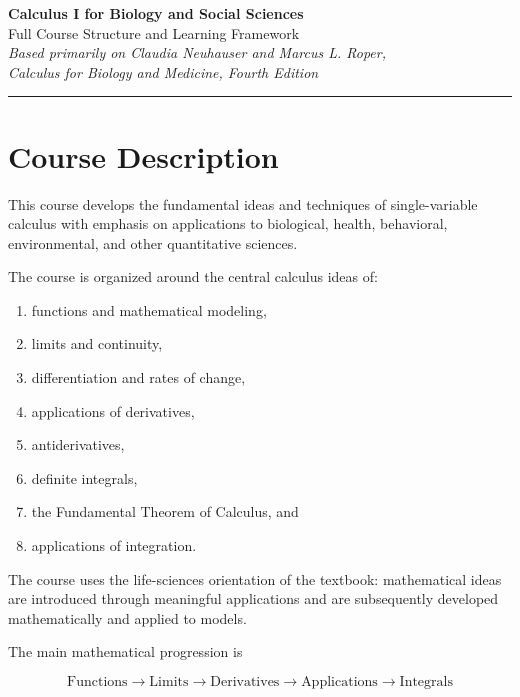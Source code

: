 \documentclass[11pt]{article}
\begin{document}
\begin{center}
    {\LARGE\bfseries Calculus I for Biology and Social Sciences}\\[4pt]
    {\large Full Course Structure and Learning Framework}\\[8pt]
    \textit{Based primarily on Claudia Neuhauser and Marcus L. Roper,}\\
    \textit{Calculus for Biology and Medicine, Fourth Edition}\\[8pt]
\end{center}

\hrule
\vspace{0.5cm}

\section{Course Description}

This course develops the fundamental ideas and techniques of single-variable
calculus with emphasis on applications to biological, health, behavioral,
environmental, and other quantitative sciences.

The course is organized around the central calculus ideas of:

\begin{enumerate}[label=\arabic*.]
    \item functions and mathematical modeling,
    \item limits and continuity,
    \item differentiation and rates of change,
    \item applications of derivatives,
    \item antiderivatives,
    \item definite integrals,
    \item the Fundamental Theorem of Calculus, and
    \item applications of integration.
\end{enumerate}

The course uses the life-sciences orientation of the textbook: mathematical
ideas are introduced through meaningful applications and are subsequently
developed mathematically and applied to models.

The main mathematical progression is

\[
\boxed{
\text{Functions}
\longrightarrow
\text{Limits}
\longrightarrow
\text{Derivatives}
\longrightarrow
\text{Applications}
\longrightarrow
\text{Integrals}
}
\]
\end{document}
